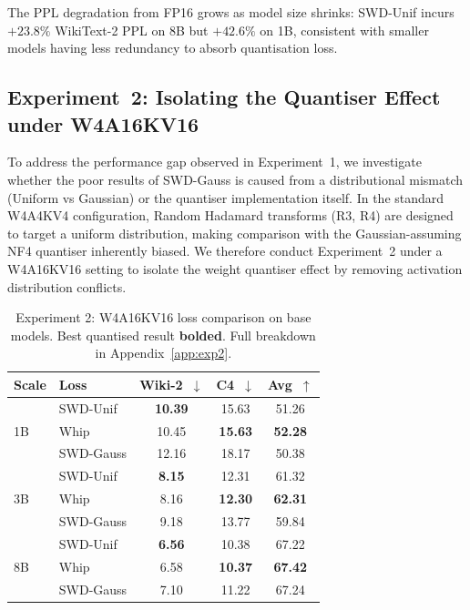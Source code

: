 \documentclass[11pt,a4paper]{article}
\newcommand{\best}[1]{\textbf{#1}}
\begin{document}
The PPL degradation from FP16 grows as model size shrinks: SWD-Unif incurs $+23.8\%$ WikiText-2 PPL on 8B but $+42.6\%$ on 1B, consistent with smaller models having less redundancy to absorb quantisation loss.
 
 
\subsection{Experiment~2: Isolating the Quantiser Effect under W4A16KV16}
\label{sec:exp2}

To address the performance gap observed in Experiment~1, we investigate whether the poor results of SWD-Gauss is caused from a distributional mismatch (Uniform vs Gaussian) or the quantiser implementation itself. In the standard W4A4KV4 configuration, Random Hadamard transforms (R3, R4) are designed to target a uniform distribution, making comparison with the Gaussian-assuming NF4 quantiser inherently biased. We therefore conduct Experiment~2 under a W4A16KV16 setting to isolate the weight quantiser effect by removing activation distribution conflicts.

\begin{table}[ht]
\centering
\caption{Experiment 2: W4A16KV16 loss comparison on base models. Best quantised result \textbf{bolded}. Full breakdown in Appendix~\ref{app:exp2}.}
\label{tab:exp2_results}
\vspace{0.3em}
\small
\begin{tabular}{ll cc c}
\toprule
\textbf{Scale} & \textbf{Loss} & \textbf{Wiki-2}~$\downarrow$ & \textbf{C4}~$\downarrow$ & \textbf{Avg}~$\uparrow$ \\
\midrule
\multirow{3}{*}{1B}
  & SWD-Unif  & \best{10.39} & 15.63 & 51.26 \\
  & Whip      & 10.45 & \best{15.63} & \best{52.28} \\
  & SWD-Gauss & 12.16 & 18.17 & 50.38 \\
\midrule
\multirow{3}{*}{3B}
  & SWD-Unif  & \best{8.15} & 12.31 & 61.32 \\
  & Whip      & 8.16 & \best{12.30} & \best{62.31} \\
  & SWD-Gauss & 9.18 & 13.77 & 59.84 \\
\midrule
\multirow{3}{*}{8B}
  & SWD-Unif  & \best{6.56} & 10.38 & 67.22 \\
  & Whip      & 6.58 & \best{10.37} & \best{67.42} \\
  & SWD-Gauss & 7.10 & 11.22 & 67.24 \\
\bottomrule
\end{tabular}%
\end{table}
\end{document}
